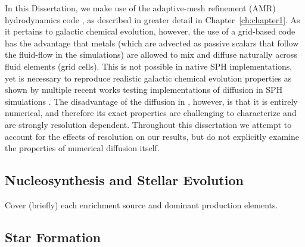 In this Dissertation, we make use of the adaptive-mesh refinement (AMR) hydrodynamics code , as described in greater detail in Chapter~\ref{ch:chapter1}. As it pertains to galactic chemical evolution, however, the use of a grid-based code has the advantage that metals (which are advected as passive scalars that follow the fluid-flow in the simulations) are allowed to mix and diffuse naturally across fluid elements (grid cells). This is not possible in native SPH implementations, yet is necessary to reproduce realistic galactic chemical evolution properties as shown by multiple recent works testing implementations of diffusion in SPH simulations \citep[e.g.][]{Shen2010,Su2017a,Escala2018}. The disadvantage of the diffusion in , however, is that it is entirely numerical, and therefore its exact properties are challenging to characterize and are strongly resolution dependent. Throughout this dissertation we attempt to account for the effects of resolution on our results, but do not explicitly examine the properties of numerical diffusion itself. 


\subsection{Nucleosynthesis and Stellar Evolution} \label{intro:sec:nucleosynthesis}

Cover (briefly) each enrichment source and dominant production elements. 


%

\subsection{Star Formation} \label{intro:sec:sf}

